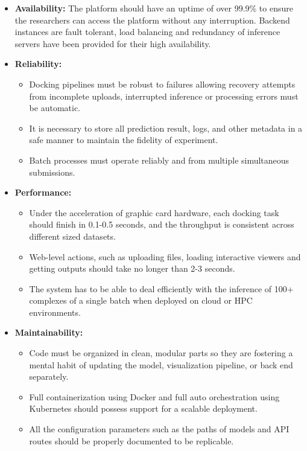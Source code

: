 \documentclass[12pt,a4]{report}
\begin{document}
\begin{itemize}

\item \textbf{Availability:}
The platform should have an uptime of over 99.9\% to ensure the researchers can access the platform without any interruption. Backend instances are fault tolerant, load balancing and redundancy of inference servers have been provided for their high availability.

\item \textbf{Reliability:}
\begin{itemize}
\item Docking pipelines must be robust to failures allowing recovery attempts from incomplete uploads, interrupted inference or processing errors must be automatic.
\item It is necessary to store all prediction result, logs, and other metadata in a safe manner to maintain the fidelity of experiment.
\item Batch processes must operate reliably and from multiple simultaneous submissions.
\end{itemize}

\item \textbf{Performance:}
\begin{itemize}
\item Under the acceleration of graphic card hardware, each docking task should finish in 0.1-0.5 seconds, and the throughput is consistent across different sized datasets.
\item Web-level actions, such as uploading files, loading interactive viewers and getting outputs should take no longer than 2-3 seconds.
\item The system has to be able to deal efficiently with the inference of 100+ complexes of a single batch when deployed on cloud or HPC environments.
\end{itemize}

\item \textbf{Maintainability:}
\begin{itemize}
\item Code must be organized in clean, modular parts so they are fostering a mental habit of updating the model, visualization pipeline, or back end separately.
\item Full containerization using Docker and full auto orchestration using Kubernetes should possess support for a scalable deployment.
\item All the configuration parameters such as the paths of models and API routes should be properly documented to be replicable.
\end{itemize}


\end{itemize}
\end{document}
